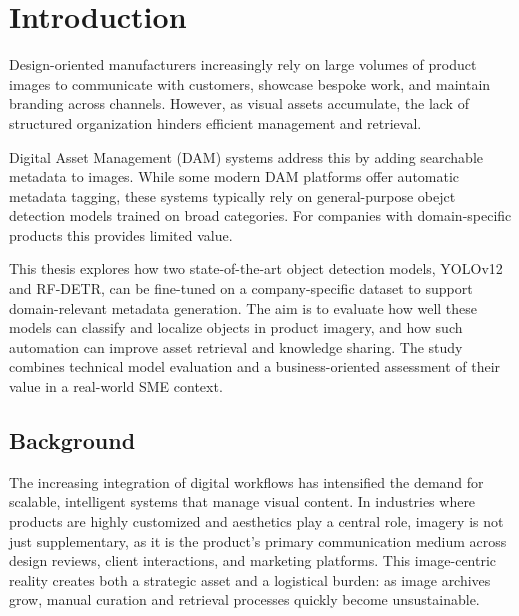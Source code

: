 \documentclass[a4paper,10pt,twocolumn]{article}
\numberwithin{figure}{section}
\numberwithin{table}{section}
\begin{document}

\twocolumn
\flushbottom %


\sloppy        %



\section{Introduction}

Design-oriented manufacturers increasingly rely on 
large volumes of product images to communicate with 
customers, showcase bespoke work, and maintain 
branding across channels. However, as visual assets 
accumulate, the lack of structured organization 
hinders efficient management and retrieval.

Digital Asset Management (DAM) systems address 
this by adding searchable metadata to images.
While some modern DAM platforms offer automatic metadata tagging, 
these systems typically rely on general-purpose obejct detection
models trained on broad categories. For companies with 
domain-specific products this provides limited value.

This thesis explores how two state-of-the-art object 
detection models, YOLOv12 and RF-DETR, can be fine-tuned on 
a company-specific dataset to support domain-relevant 
metadata generation. The aim is to evaluate how well 
these models can classify and localize objects in 
product imagery, and how such automation can 
improve asset retrieval and knowledge sharing.  
The study combines technical 
model evaluation and a business-oriented assessment 
of their value in a real-world SME context.


\subsection{Background}
The increasing integration of digital workflows 
has intensified the demand for scalable, intelligent 
systems that manage visual content. 
In industries where products are highly customized 
and aesthetics play a central role, imagery is not 
just supplementary, as it is the product’s primary 
communication medium across design reviews, client 
interactions, and marketing platforms. This 
image-centric reality creates both a strategic 
asset and a logistical burden: as image archives 
grow, manual curation and retrieval processes 
quickly become unsustainable.
\end{document}
